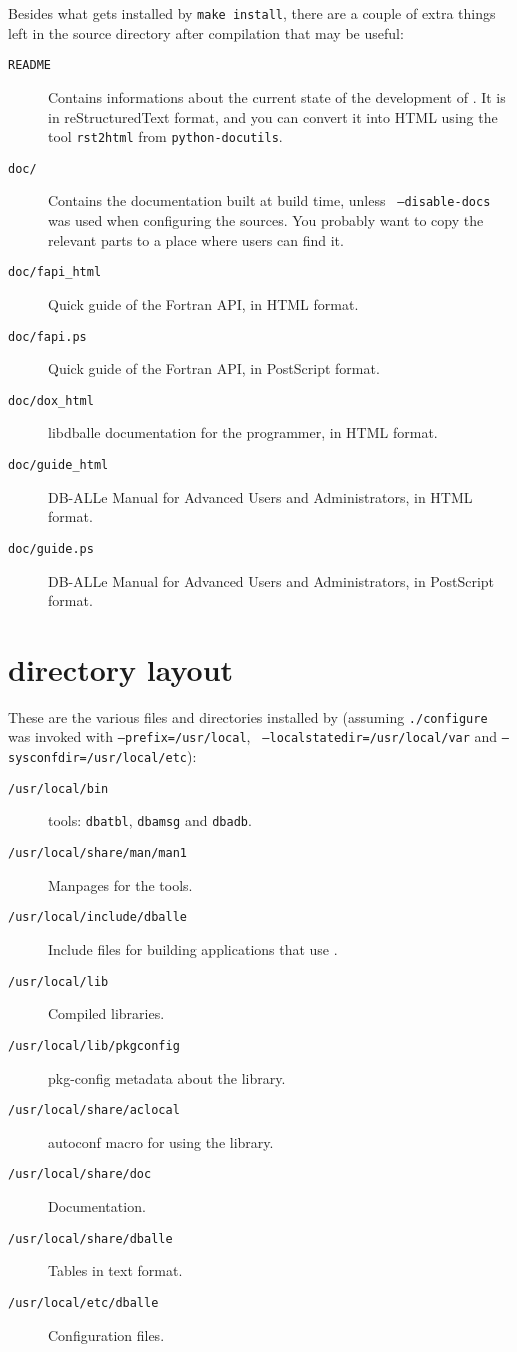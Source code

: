 Besides what gets installed by {\tt make install}, there are a couple of extra
things left in the source directory after compilation that may be useful:

\begin{description}
\item[{\tt README}] Contains informations about the current state of the
	development of \dballe{}.  It is in reStructuredText format, and you
	can convert it into HTML using the tool {\tt rst2html} from
	{\tt python-docutils}.
\item[{\tt doc/}] Contains the documentation built at build time, unless {\tt
	--disable-docs} was used when configuring the sources.  You probably
	want to copy the relevant parts to a place where users can find it.
\item[{\tt doc/fapi\_html}] Quick guide of the Fortran API, in HTML format.
\item[{\tt doc/fapi.ps}] Quick guide of the Fortran API, in PostScript format.
\item[{\tt doc/dox\_html}] libdballe documentation for the programmer, in HTML format.
\item[{\tt doc/guide\_html}] DB-ALLe Manual for Advanced Users and Administrators, in HTML format.
\item[{\tt doc/guide.ps}] DB-ALLe Manual for Advanced Users and Administrators, in PostScript format.
\end{description}


\section {\dballe{} directory layout}
\label{install-dir-layout}

These are the various files and directories installed by \dballe{} (assuming
{\tt ./configure} was invoked with {\tt --prefix=/usr/local}, {\tt
--localstatedir=/usr/local/var} and {\tt --sysconfdir=/usr/local/etc}):

\begin{description}
\item[{\tt /usr/local/bin}]
	\dballe{} tools: {\tt dbatbl}, {\tt dbamsg} and {\tt dbadb}.
\item[{\tt /usr/local/share/man/man1}]
	Manpages for the \dballe{} tools.
\item[{\tt /usr/local/include/dballe}]
	Include files for building applications that use \dballe{}.
\item[{\tt /usr/local/lib}]
	Compiled libraries.
\item[{\tt /usr/local/lib/pkgconfig}]
	pkg-config metadata about the library.
\item[{\tt /usr/local/share/aclocal}]
	autoconf macro for using the library.
\item[{\tt /usr/local/share/doc}]
	Documentation.
\item[{\tt /usr/local/share/dballe}]
	Tables in text format.
\item[{\tt /usr/local/etc/dballe}]
	Configuration files.
\end{description}
